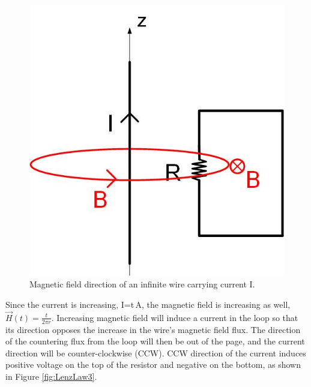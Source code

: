 \documentclass{ximera}
\begin{document}
\begin{example}
\begin{explanation}
\begin{figure}[htbp]
\begin{center}
\includegraphics[scale=0.5]{../jpg/Lenzlaw1.jpg}
\end{center}
\caption{Magnetic field direction of an infinite wire carrying current I.}
\label{fig:LenzLaw1}
\end{figure}

 Since the current is increasing, I=t\,A, the magnetic field is increasing as well, $\vec{H}(t)=\frac{t}{2 \pi r}$. Increasing magnetic field will induce a current in the loop so that its direction opposes the increase in the wire's magnetic field flux. The direction of the countering flux from the loop will then be out of the page, and the current direction will be counter-clockwise (CCW). CCW direction of the current induces positive voltage on the top of the resistor and negative on the bottom, as shown in Figure \ref{fig:LenzLaw3}.





\end{explanation}
\end{example}
\end{document}
